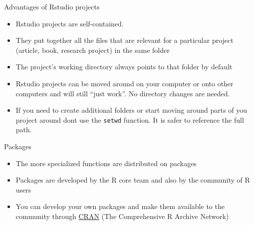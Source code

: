 \documentclass[ignorenonframetext,]{beamer}
\begin{document}
\begin{frame}[fragile]{Advantages of Rstudio projects}
\protect\hypertarget{advantages-of-rstudio-projects}{}

\begin{itemize}
\item
  Rstudio projects are self-contained.
\item
  They put together all the files that are relevant for a particular
  project (article, book, research project) in the same folder
\item
  The project's working directory always points to that folder by
  default
\item
  Rstudio projects can be moved around on your computer or onto other
  computers and will still ``just work''. No directory changes are
  needed.
\item
  If you need to create additional folders or start moving around parts
  of you project around dont use the \texttt{setwd} function. It is
  safer to reference the full path.
\end{itemize}

\end{frame}

\begin{frame}{Packages}
\protect\hypertarget{packages}{}

\begin{itemize}
\item
  The more specialized functions are distributed on packages
\item
  Packages are developed by the R core team and also by the community of
  R users
\item
  You can develop your own packages and make them available to the
  community through \href{https://cran.r-project.org}{CRAN} (The
  Comprehensive R Archive Network)
\end{itemize}

\end{frame}
\end{document}
